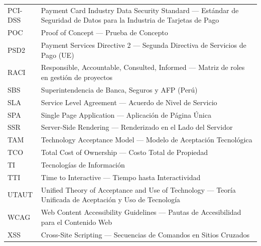 \begin{longtable}{@{}p{2.2cm}p{12.5cm}@{}}
PCI-DSS & Payment Card Industry Data Security Standard --- Estándar de Seguridad de Datos para la Industria de Tarjetas de Pago \\
POC & Proof of Concept --- Prueba de Concepto \\
PSD2 & Payment Services Directive 2 --- Segunda Directiva de Servicios de Pago (UE) \\
RACI & Responsible, Accountable, Consulted, Informed --- Matriz de roles en gestión de proyectos \\
SBS & Superintendencia de Banca, Seguros y AFP (Perú) \\
SLA & Service Level Agreement --- Acuerdo de Nivel de Servicio \\
SPA & Single Page Application --- Aplicación de Página Única \\
SSR & Server-Side Rendering --- Renderizado en el Lado del Servidor \\
TAM & Technology Acceptance Model --- Modelo de Aceptación Tecnológica \\
TCO & Total Cost of Ownership --- Costo Total de Propiedad \\
TI & Tecnologías de Información \\
TTI & Time to Interactive --- Tiempo hasta Interactividad \\
UTAUT & Unified Theory of Acceptance and Use of Technology --- Teoría Unificada de Aceptación y Uso de Tecnología \\
WCAG & Web Content Accessibility Guidelines --- Pautas de Accesibilidad para el Contenido Web \\
XSS & Cross-Site Scripting --- Secuencias de Comandos en Sitios Cruzados \\
\end{longtable}
